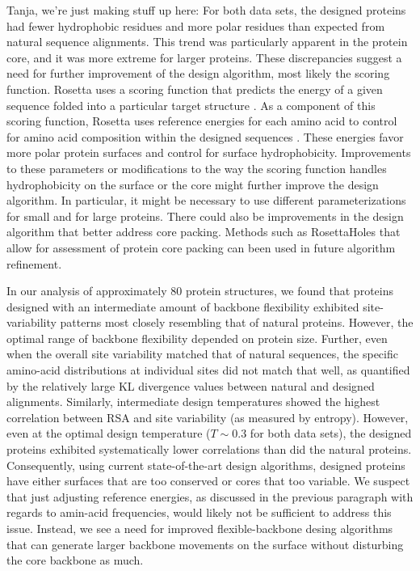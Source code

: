 \documentclass[12pt]{article}
\begin{document}
{\color{green}Tanja, we're just making stuff up here:} For both data sets, the designed proteins had fewer hydrophobic residues and more polar residues than expected from natural sequence alignments. This trend was particularly apparent in the protein core, and it was more extreme for larger proteins. These discrepancies suggest a need for further improvement of the design algorithm, most likely the scoring function. Rosetta uses a scoring function that predicts the energy of a given sequence folded into a particular target structure \citep{Das2008}. As a component of this scoring function, Rosetta uses reference energies for each amino acid to control for amino acid composition within the designed sequences \citep{Jacak2012}. These energies favor more polar protein surfaces and control for surface hydrophobicity. Improvements to these parameters or modifications to the way the scoring function handles hydrophobicity on the surface or the core might further improve the design algorithm. In particular, it might be necessary to use different parameterizations for small and for large proteins. There could also be improvements in the design algorithm that better address core packing. Methods such as RosettaHoles \citep{ShefflerBaker} that allow for assessment of protein core packing can been used in future algorithm refinement.

In our analysis of approximately 80 protein structures, we found that proteins designed with an intermediate amount of backbone flexibility exhibited site-variability patterns most closely resembling that of natural proteins.  However, the optimal range of backbone flexibility depended on protein size. Further, even when the overall site variability matched that of natural sequences, the specific amino-acid distributions at individual sites did not match that well, as quantified by the relatively large KL divergence values between natural and designed alignments. Similarly, intermediate design temperatures showed the highest correlation between RSA and site variability (as measured by entropy). However, even at the optimal design temperature ($T \sim 0.3$ for both data sets), the designed proteins exhibited systematically lower correlations than did the natural proteins. Consequently, using current state-of-the-art design algorithms, designed proteins have either surfaces that are too conserved or cores that too variable. We suspect that just adjusting reference energies, as discussed in the previous paragraph with regards to amin-acid frequencies, would likely not be sufficient to address this issue. Instead, we see a need for improved flexible-backbone desing algorithms that can generate larger backbone movements on the surface without disturbing the core backbone as much.
\end{document}
